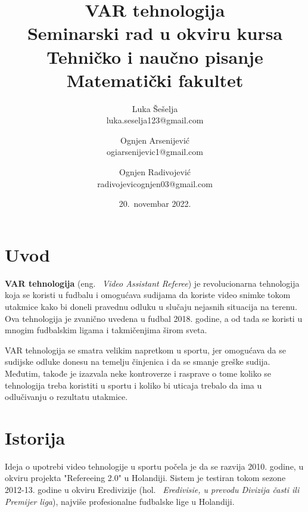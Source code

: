 \documentclass[a4paper]{article}
\begin{document}
\title{VAR tehnologija\\ \small{Seminarski rad u okviru kursa\\Tehničko i naučno pisanje\\ Matematički fakultet}}

\author{Luka Šešelja\\ luka.seselja123@gmail.com \and Ognjen Arsenijević\\ ogiarsenijevic1@gmail.com \and Ognjen Radivojević\\ radivojevicognjen03@gmail.com}
\date{20.~novembar 2022.}
\maketitle

\begin{abstract}
    
\end{abstract}

\tableofcontents

\newpage

\section{Uvod}
\textbf{VAR tehnologija} (eng. ~{\em Video Assistant Referee}) je revolucionarna tehnologija koja se koristi u fudbalu i omogućava sudijama da koriste video snimke tokom utakmice kako bi doneli pravednu odluku u slučaju nejasnih situacija na terenu. Ova tehnologija je  zvanično uvedena u fudbal 2018. godine, a od tada se koristi u mnogim fudbalskim ligama i takmičenjima širom sveta.

VAR tehnologija se smatra velikim napretkom u sportu, jer omogućava da se sudijske odluke donesu na temelju činjenica i da se smanje greške sudija. Međutim, takođe je izazvala neke kontroverze i rasprave o tome koliko se tehnologija treba koristiti u sportu i koliko bi uticaja trebalo da ima u odlučivanju o rezultatu utakmice.

\section{Istorija}
Ideja o upotrebi video tehnologije u sportu počela je da se razvija 2010. godine, u okviru projekta "Refereeing 2.0" u Holandiji. Sistem je testiran tokom sezone 2012-13. godine u okviru Eredivizije (hol. ~{\em Eredivisie, u prevodu Divizija časti ili Premijer liga}), najviše profesionalne fudbalske lige u Holandiji.
\end{document}
